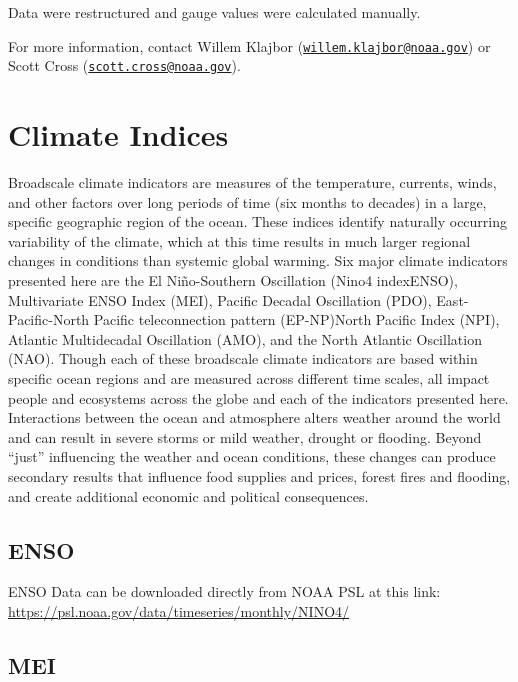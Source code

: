 \documentclass[
]{book}
\begin{document}
Data were restructured and gauge values were calculated manually.

For more information, contact Willem Klajbor (\href{mailto:willem.klajbor@noaa.gov}{\nolinkurl{willem.klajbor@noaa.gov}}) or Scott Cross (\href{mailto:scott.cross@noaa.gov}{\nolinkurl{scott.cross@noaa.gov}}).

\hypertarget{climate-indices}{%
\chapter{Climate Indices}\label{climate-indices}}

Broadscale climate indicators are measures of the temperature, currents, winds, and other factors over long periods of time (six months to decades) in a large, specific geographic region of the ocean. These indices identify naturally occurring variability of the climate, which at this time results in much larger regional changes in conditions than systemic global warming. Six major climate indicators presented here are the El Niño-Southern Oscillation (Nino4 indexENSO), Multivariate ENSO Index (MEI), Pacific Decadal Oscillation (PDO), East-Pacific-North Pacific teleconnection pattern (EP-NP)North Pacific Index (NPI), Atlantic Multidecadal Oscillation (AMO), and the North Atlantic Oscillation (NAO). Though each of these broadscale climate indicators are based within specific ocean regions and are measured across different time scales, all impact people and ecosystems across the globe and each of the indicators presented here. Interactions between the ocean and atmosphere alters weather around the world and can result in severe storms or mild weather, drought or flooding. Beyond ``just'' influencing the weather and ocean conditions, these changes can produce secondary results that influence food supplies and prices, forest fires and flooding, and create additional economic and political consequences.

\hypertarget{enso}{%
\section{ENSO}\label{enso}}

ENSO Data can be downloaded directly from NOAA PSL at this link: \url{https://psl.noaa.gov/data/timeseries/monthly/NINO4/}

\hypertarget{mei}{%
\section{MEI}\label{mei}}
\end{document}

